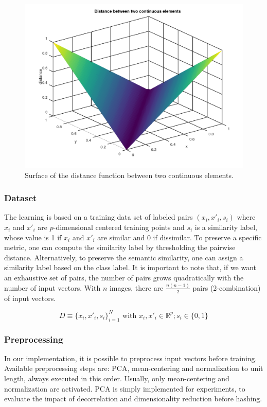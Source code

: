 \begin{figure}
	\includegraphics[width=\textwidth]{img/continuous_hamming_distance.png}
	\caption{Surface of the distance function between two continuous elements.}
	\label{fig:continuous_hamming_distance}
\end{figure}

\subsubsection{Dataset}
The learning is based on a training data set of labeled pairs $(x_i, x'_i, s_i)$ where $x_i$ and $x'_i$ are $p$-dimensional centered training points and $s_i$ is a similarity label, whose value is 1 if $x_i$ and $x'_i$ are similar and 0 if dissimilar. To preserve a specific metric, one can compute the similarity label by thresholding the pairwise distance. Alternatively, to preserve the semantic similarity, one can assign a similarity label based on the class label. It is important to note that, if we want an exhaustive set of pairs, the number of pairs grows quadratically with the number of input vectors. With $n$ images, there are $\frac{n(n-1)}{2}$ pairs (2-combination) of input vectors.

\[D \equiv \{x_i, x'_i, s_i\}_{i=1}^N \text{ with } x_i, x'_i \in \mathbb{R}^{p} ; s_i \in \{0, 1\} \]

\subsubsection{Preprocessing}
In our implementation, it is possible to preprocess input vectors before training. Available preprocessing steps are: PCA, mean-centering and normalization to unit length, always executed in this order. Usually, only mean-centering and normalization are activated. PCA is simply implemented for experiments, to evaluate the impact of decorrelation and dimensionality reduction before hashing.

